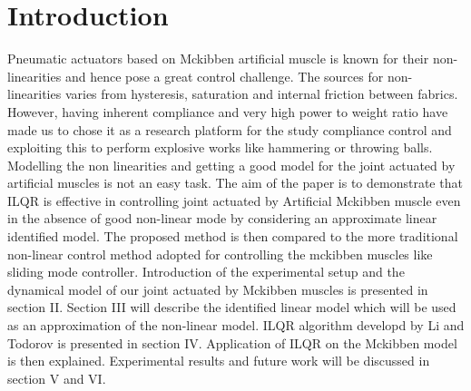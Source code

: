 \documentclass[conference]{IEEEtran}
\begin{document}
\section{Introduction}
Pneumatic actuators based on Mckibben artificial muscle is known for their non-linearities and hence pose a great control challenge. The sources for non-linearities varies from  hysteresis, saturation and internal friction between fabrics. However, having inherent compliance and very high power to weight ratio have made us to chose it as a research platform for the study compliance control and exploiting this to perform explosive works like hammering or throwing balls. Modelling the non linearities and getting a good model for the joint actuated by artificial muscles is not an easy task. The aim of the paper is to demonstrate that ILQR is effective in controlling joint actuated by Artificial Mckibben muscle even in the absence of good non-linear mode by considering an approximate linear identified model. The proposed method is then compared to the more traditional non-linear control method adopted for controlling the mckibben muscles like sliding mode controller. 
Introduction of the experimental setup and the dynamical model of our joint actuated by Mckibben muscles is presented in section II. Section III will describe the identified linear model which will be used as an approximation of the non-linear model. ILQR algorithm developd by Li and Todorov \cite{todorov} is presented in section IV. Application of ILQR on the Mckibben model is then explained. Experimental results and future work will be discussed in section V and VI.



%
%
\end{document}
